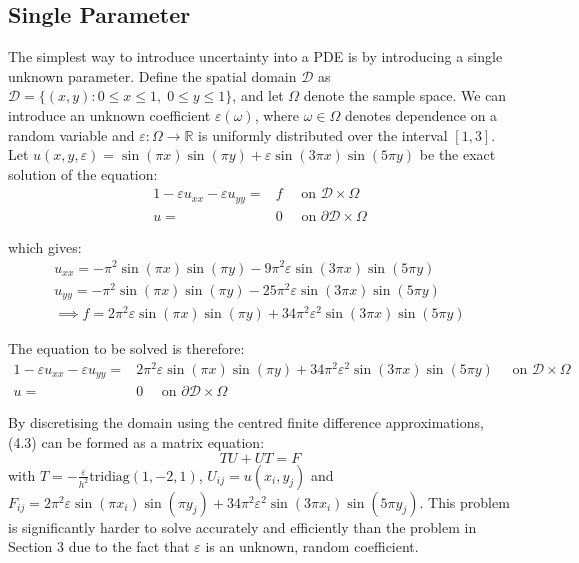 \documentclass{article}
\numberwithin{equation}{section}
\begin{document}
\subsection{Single Parameter}
The simplest way to introduce uncertainty into a PDE is by introducing a single unknown parameter. Define the spatial domain $\mathcal{D}$ as $\mathcal{D} = \{(x,y) : 0 \leq x \leq 1, \; 0 \leq y \leq 1 \}$, and let $\Omega$ denote the sample space. We can introduce an unknown coefficient $\varepsilon(\omega)$, where $\omega \in \Omega$ denotes dependence on a random variable and $\varepsilon: \Omega \rightarrow \mathbb{R}$ is uniformly distributed over the interval $[1,3]$. Let $u(x,y,\varepsilon) = \sin(\pi x)\sin(\pi y) + \varepsilon \sin(3 \pi x) \sin(5 \pi y)$ be the exact solution of the equation:
\begin{alignat}{1}
-\varepsilon u_{xx} -\varepsilon u_{yy} = {}& f \quad \text{ on } \mathcal{D} \times \Omega \nonumber \\
u = {}& 0 \quad \text{ on } \partial \mathcal{D} \times \Omega
\end{alignat}

which gives:
\begin{equation}
\begin{split}
u_{xx} = -\pi^2 \sin(\pi x) \sin(\pi y) - 9\pi^2 \varepsilon \sin(3\pi x) \sin(5\pi y) \\
u_{yy} = -\pi^2 \sin(\pi x) \sin(\pi y) - 25\pi^2 \varepsilon \sin(3\pi x) \sin(5\pi y) \\
\implies f = 2\pi^2 \varepsilon \sin(\pi x) \sin(\pi y) + 34\pi^2 \varepsilon^2 \sin(3\pi x) \sin(5\pi y)
\end{split}
\end{equation}

The equation to be solved is therefore:
\begin{alignat}{1}
- \varepsilon u_{xx} - \varepsilon u_{yy} = {} & 2\pi^2 \varepsilon \sin(\pi x) \sin(\pi y)+ 34 \pi^2 \varepsilon^2 \sin(3 \pi x) \sin(5 \pi y) \quad \text{ on } \mathcal{D} \times \Omega \nonumber \\
u = {} & 0 \quad \text{ on } \partial \mathcal{D} \times \Omega
\end{alignat}

By discretising the domain using the centred finite difference approximations, (4.3) can be formed as a matrix equation:
\begin{equation}
TU + UT = F
\end{equation}
with $T = -\frac{\varepsilon}{h^2} \text{tridiag}(1,-2,1)$, $U_{ij} = u(x_i, y_j)$ and $F_{ij} = 2\pi^2 \varepsilon \sin(\pi x_i) \sin(\pi y_j)+ 34 \pi^2 \varepsilon^2 \sin(3 \pi x_i) \sin(5 \pi y_j)$. This problem is significantly harder to solve accurately and efficiently than the problem in Section 3 due to the fact that $\varepsilon$ is an unknown, random coefficient.
\end{document}
